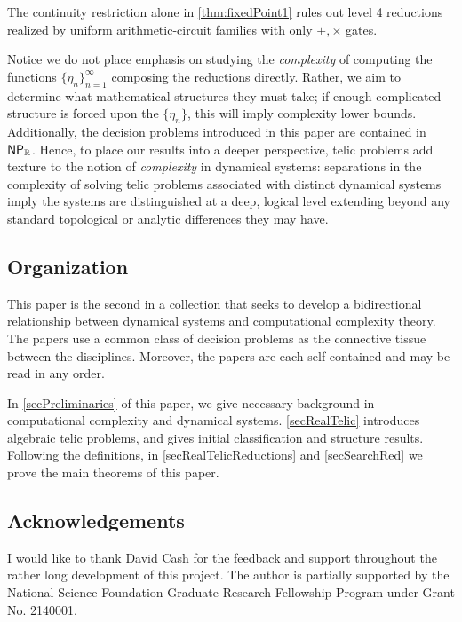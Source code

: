 \documentclass{amsart}
\theoremstyle{theorem}
\theoremstyle{remark}
\newcommand{\RR}{\mathbb{R}}
\newcommand{\ccNP}{\textsf{\upshape NP}}
\begin{document}
The continuity restriction alone in \cref{thm:fixedPoint1} rules out level 4 reductions realized by uniform arithmetic-circuit families with only $+,\times$ gates.

Notice we do not place emphasis on studying the \emph{complexity} of computing the functions $\{\eta_n\}_{n=1}^\infty$ composing the reductions directly. Rather, we aim to determine what mathematical structures they must take; if enough complicated structure is forced upon the $\{\eta_n\}$, this will imply complexity lower bounds.
Additionally, the decision problems introduced in this paper are contained in $\ccNP_\RR$.
Hence, to place our results into a deeper perspective, telic problems add texture to the notion of \emph{complexity} in dynamical systems: separations in the complexity of solving telic problems associated with distinct dynamical systems imply the systems are distinguished at a deep, logical level extending beyond any standard topological or analytic differences they may have.

\subsection{Organization}
This paper is the second in a collection \cite{everett1,everett3} that seeks to develop a bidirectional relationship between dynamical systems and computational complexity theory. The papers use a common class of decision problems as the connective tissue between the disciplines. Moreover, the papers are each self-contained and may be read in any order.

In \cref{secPreliminaries} of this paper, we give necessary background in computational complexity and dynamical systems. \cref{secRealTelic} introduces algebraic telic problems, and gives initial classification and structure results. Following the definitions, in  \cref{secRealTelicReductions} and \cref{secSearchRed} we prove the main theorems of this paper.


\subsection*{Acknowledgements}
I would like to thank David Cash for the feedback and support throughout the rather long development of this project.
The author is partially supported by the National Science Foundation Graduate Research Fellowship Program under Grant No. 2140001.
\end{document}
